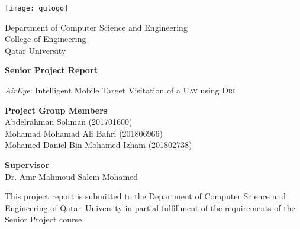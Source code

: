 \documentclass[../main.tex]{subfiles}
\begin{document}
        \thispagestyle{empty}


        \centering
        \texttt{[image: qulogo]}

        \Large
        Department of Computer Science and Engineering\\
        College of Engineering\\
        Qatar University\\

        \vspace{2.5cm}

        \Huge
        \textbf{Senior Project Report}

        \vspace{1.1cm}
        \Large
        \emph{AirEye}: Intelligent Mobile Target Visitation of a \textsc{Uav} using \textsc{Drl}

        \vspace{3.3cm}

        \raggedright
        \large
        \-\hspace{0.8cm} \textbf{Project Group Members}\\
        \normalsize
        \medskip
        \-\hspace{1.3cm} Abdelrahman Soliman (201701600)\\
        \-\hspace{1.3cm} Mohamad Mohamad Ali Bahri (201806966)\\
        \-\hspace{1.3cm} Mohamed Daniel Bin Mohamed Izham (201802738)\\

        \vspace{1.0cm}

        \large
        \-\hspace{0.8cm} \textbf{Supervisor}\\
        \normalsize
        \medskip
        \-\hspace{1.3cm} Dr. Amr Mahmoud Salem Mohamed\\

        \vfill

        \small

        This project report is submitted to the Department
        of Computer Science and Engineering of Qatar~University 
        in partial fulfillment of the
        requirements of the Senior Project course.

        \vspace{0.8cm}
\end{document}
